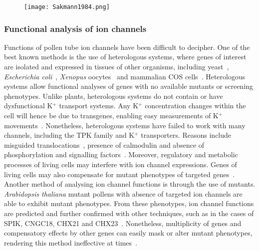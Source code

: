 \documentclass[11pt]{article}
\begin{document}
\begin{multicols*}{2}
\begin{figure}[H]
  \centering
    \texttt{[image: Sakmann1984.png]}
  \label{fig:patchy}
\end{figure}

\subsubsection{Functional analysis of ion channels}
Functions of pollen tube ion channels have been difficult to decipher. One of the best known methods is the use of heterologous systems, where genes of interest are isolated and expressed in tissues of other organisms, including yeast~\citep{Latz2007}, \textit{Escherichia coli}~\citep{Uozumi1998}, \textit{Xenopus} oocytes~\citep{Leng1999} and mammalian COS cells~\citep{Mouline2002}. Heterologous systems allow functional analyses of genes with no available mutants or screening phenotypes. Unlike plants, heterologous systems do not contain or have dysfunctional K$^{+}$ transport systems. Any K$^{+}$ concentration changes within the cell will hence be due to transgenes, enabling easy measurements of K$^{+}$ movements~\citep{Frommer1995}.
\newline\newline
Nonetheless, heterologous systems have failed to work with many channels, including the TPK family and K$^{+}$ transporters. Reasons include misguided translocations~\citep{Marcel2010}, presence of calmodulin and absence of phosphorylation and signalling factors~\citep{Lebaudy2007a}. Moreover, regulatory and metabolic processes of living cells may interfere with ion channel expressions. Genes of living cells may also compensate for mutant phenotypes of targeted genes~\citep{Frommer1995}. 
\newline\newline
Another method of analysing ion channel functions is through the use of mutants. \textit{Arabidopsis thaliana} mutant pollens with absence of targeted ion channels are able to exhibit mutant phenotypes. From these phenotypes, ion channel functions are predicted and further confirmed with other techniques, such as in the cases of SPIK, CNGC18, CHX21 and CHX23~\citep{Frietsch2007,Mouline2002}. Nonetheless, multiplicity of genes and compensatory effects by other genes can easily mask or alter mutant phenotypes, rendering this method ineffective at times~\citep{Lu2011}.

\end{multicols*}
\end{document}
